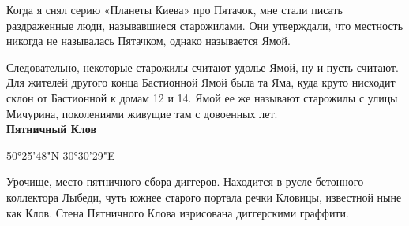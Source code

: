 Когда я снял серию «Планеты Киева» про Пятачок, мне стали писать раздраженные люди, называвшиеся старожилами. Они утверждали, что местность никогда не называлась Пятачком, однако называется Ямой. 

Следовательно, некоторые старожилы считают удолье Ямой, ну и пусть считают. Для жителей другого конца Бастионной Ямой была та Яма, куда круто нисходит склон от Бастионной к домам 12 и 14. Ямой ее же называют старожилы с улицы Мичурина, поколениями живущие там с довоенных лет.\\

\textbf{Пятничный Клов}

50°25'48"N 30°30'29"E

Урочище, место пятничного сбора диггеров. Находится в русле бетонного коллектора Лыбеди, чуть южнее старого портала речки Кловицы, известной ныне как Клов. Стена Пятничного Клова изрисована диггерскими граффити.
